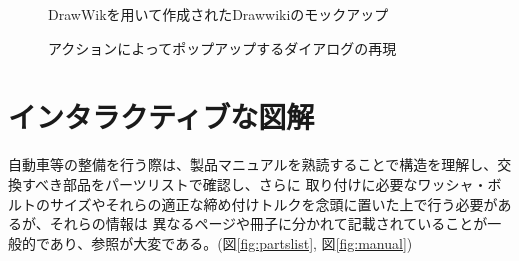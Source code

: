 \begin{figure}[H] \begin{minipage}{0.5\hsize}
                      \begin{center} 
                      \end{center} \caption{DrawWikを用いて作成されたDrawwikiのモックアップ} \label{fig:protodrawwiki1}
\end{minipage} \begin{minipage}{0.5\hsize}
                   \begin{center} 
                   \end{center} \caption{アクションによってポップアップするダイアログの再現} \label{fig:protodrawwiki2}
\end{minipage}
\end{figure}


\section{インタラクティブな図解}
\label{drawiki:zukai}
自動車等の整備を行う際は、製品マニュアルを熟読することで構造を理解し、交換すべき部品をパーツリストで確認し、さらに
取り付けに必要なワッシャ・ボルトのサイズやそれらの適正な締め付けトルクを念頭に置いた上で行う必要があるが、それらの情報は
異なるページや冊子に分かれて記載されていることが一般的であり、参照が大変である。(図\ref{fig:partslist}, 図\ref{fig:manual})

